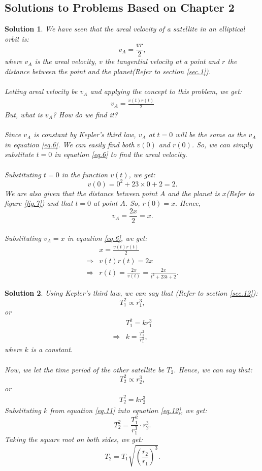 \documentclass[a4paper]{report}
\newtheorem{solution}{Solution}
\begin{document}
\subsection{Solutions to Problems Based on Chapter 2}
\setcounter{solution}{0}
  \begin{solution} \normalfont
    We have seen that the areal velocity of a satellite in an elliptical orbit is:
    $$v_A=\frac{vr}{2},$$where $v_A$ is the areal velocity, $v$ the tangential velocity at a point and $r$ the
    distance between the point and the planet(Refer to section \ref{sec.1}).\\\\
    Letting areal velocity be $v_A$ and applying the concept to this problem, we get: 
    \begin{align} \label{eq.6}
      v_A=\frac{v(t)r(t)}{2}
    \end{align}
    But, what is $v_A$? How do we find it?\\\\
    Since $v_A$ is constant by Kepler's third law, $v_A$ at $t=0$ will be the same as the $v_A$ in equation 
    \ref{eq.6}.
    We can easily find both $v(0)$ and $r(0)$. So, we can simply substitute $t=0$ in equation \ref{eq.6} to 
    find the areal velocity. \\\\
    Substituting $t=0$ in the function $v(t)$, we get: $$v(0)=0^2+23\times 0 +2 = 2.$$
    We are also given that the distance between point $A$ and the planet is $x$(Refer to figure \ref{fig.7}) and 
    that $t=0$ at point $A$. So, $r(0)=x.$ Hence, $$v_A=\frac{2x}{2}=x.$$\\
    Substituting $v_A=x$ in equation \ref{eq.6}, we get: 
    \begin{align*}
      &x=\frac{v(t)r(t)}{2}\\
      \Rightarrow &v(t)r(t)=2x\\
      \Rightarrow &r(t)=\frac{2x}{v(t)}=\boxed{\frac{2x}{t^2+23t+2}}.
    \end{align*}
  \end{solution}
  \begin{solution} \label{sol.2}\normalfont
    Using Kepler's third law, we can say that (Refer to section \ref{sec.12}): $$T_1^2 \propto r_1^3,$$
    or 
    \begin{equation}\label{eq.11}
      \begin{split}
        &T_1^2=kr_1^3\\
        \Rightarrow &k=\frac{T_1^2}{r_1^3},
      \end{split}
    \end{equation} 
    where $k$ is a constant.\\\\
    Now, we let the time period of the other satellite be $T_2$. Hence, we can say that: $$T_2^2\propto r_2^3,$$
    or
    \begin{align} \label{eq.12}
      T_{2}^{2}=kr_2^3
    \end{align}
    Substituting $k$ from equation \ref{eq.11} into equation \ref{eq.12}, we get: 
    $$T_2^2=\frac{T_1^2}{r_1^3}\cdot r_2^3.$$
    Taking the square root on both sides, we get: $$T_2=\boxed{T_1\sqrt{\left(\frac{r_2}{r_1}\right)^3}}.$$
  \end{solution}
\end{document}
